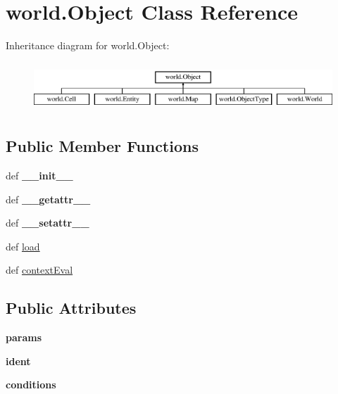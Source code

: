 \hypertarget{classworld_1_1_object}{\section{world.\-Object \-Class \-Reference}
\label{classworld_1_1_object}
}
\-Inheritance diagram for world.\-Object\-:\begin{figure}[H]
\begin{center}
\leavevmode
\includegraphics[height=1.866667cm]{classworld_1_1_object}
\end{center}
\end{figure}
\subsection*{\-Public \-Member \-Functions}
\begin{DoxyCompactItemize}
\item 
\hypertarget{classworld_1_1_object_adefdff05a80c764df6a91c497c9d27da}{def {\bfseries \-\_\-\-\_\-init\-\_\-\-\_\-}}\label{classworld_1_1_object_adefdff05a80c764df6a91c497c9d27da}

\item 
\hypertarget{classworld_1_1_object_af0b8e5af06bcfba8ffb6ff5e77be5466}{def {\bfseries \-\_\-\-\_\-getattr\-\_\-\-\_\-}}\label{classworld_1_1_object_af0b8e5af06bcfba8ffb6ff5e77be5466}

\item 
\hypertarget{classworld_1_1_object_a8a1746e28f09cb166298611273b89801}{def {\bfseries \-\_\-\-\_\-setattr\-\_\-\-\_\-}}\label{classworld_1_1_object_a8a1746e28f09cb166298611273b89801}

\item 
def \hyperlink{classworld_1_1_object_a5763929b18e99a5859c51c356cf6aa95}{load}
\item 
def \hyperlink{classworld_1_1_object_a033e92753d3a3013ce0f802ac68561df}{context\-Eval}
\end{DoxyCompactItemize}
\subsection*{\-Public \-Attributes}
\begin{DoxyCompactItemize}
\item 
\hypertarget{classworld_1_1_object_a3f8407bd1346f29b95bd651bf645bcbe}{{\bfseries params}}\label{classworld_1_1_object_a3f8407bd1346f29b95bd651bf645bcbe}

\item 
\hypertarget{classworld_1_1_object_a23980bf5784d05a3df4044d8486d8903}{{\bfseries ident}}\label{classworld_1_1_object_a23980bf5784d05a3df4044d8486d8903}

\item 
\hypertarget{classworld_1_1_object_a0534d4fbdc73788cb26f9ff1f3bc26b4}{{\bfseries conditions}}\label{classworld_1_1_object_a0534d4fbdc73788cb26f9ff1f3bc26b4}

\end{DoxyCompactItemize}
